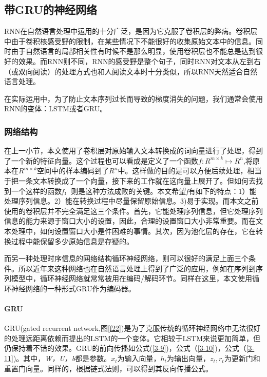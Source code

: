 \subsection{带GRU的神经网络}
RNN在自然语言处理中运用的十分广泛，是因为它克服了卷积层的弊病。卷积层中由于卷积核感受野的限制，在某些情况下不能很好的收集原始文本中的信息。同时由于自然语言的局部相关性有时候不是那么明显，使用卷积层也不能总是达到很好的效果。而RNN则不同，RNN的感受野是整个句子，同时RNN对文本从左到右（或双向阅读）的处理方式也和人阅读文本时十分类似，所以RNN天然适合自然语言处理。

在实际运用中，为了防止文本序列过长而导致的梯度消失的问题，我们通常会使用RNN的变体：LSTM或者GRU。
\subsubsection{网络结构}
在上一小节，本文使用了卷积层对原始输入文本转换成的词向量进行了处理，得到了一个新的特征向量。这个过程也可以看成是定义了一个函数\(f:R^{m\times k}\mapsto R^n\),将原本在\(R^{m\times k}\)空间中的样本编码到了\(R^n\)中。这样做的目的是可以方便后续处理，相当于把一条文本转换成了一个向量，接下来的工作就在这向量上展开了。但如何去找到一个这样的函数\textit{f}，则是这种方法成败的关键。本文希望\textit{f}有如下的特点：1）能处理序列信息。2）能在转换过程中尽量保留原始信息。3)易于实现。而本文之前使用的卷积层并不完全满足这三个条件。首先，它能处理序列信息，但它处理序列信息的能力来源于窗口大小的设置，因此，合理的设置窗口大小非常重要。而在文本处理中，如何设置窗口大小是件困难的事情。其次，因为池化层的存在，它在转换过程中能保留多少原始信息是存疑的。

而另一种处理时序信息的网络结构循环神经网络，则可以很好的满足上面三个条件。所以近年来这种网络也在自然语言处理上得到了广泛的应用，例如在序列到序列模型中，循环神经网络就常常被用在编码/解码环节。同样在这里，本文使用循环神经网络的一种形式$\mathrm{GRU}$作为编码器。

\paragraph{GRU}
GRU(gated recurrent network,图\ref{f22})是为了克服传统的循环神经网络中无法很好的处理远距离依赖而提出的$\mathrm{LSTM}$的一个变体。它相较于$\mathrm{LSTM}$来说更加简单，但仍保持着不错的效果。GRU的前向传播如公式(\ref{3-9})，公式（\ref{3-10})，公式（\ref{3-11})。其中，\textit{W，U，b}都是参数。\(x_t\)为输入向量，\(h_t\)为输出向量，\(z_t,r_t\)为更新门和重置门向量。同样的，根据链式法则，可以得到其反向传播公式。

